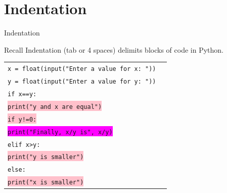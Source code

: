 \documentclass[t,handout,9pt]{beamer}
\begin{document}
\section{Indentation}
\begin{frame}{Indentation}
\begin{block}{Recall}
Indentation (tab or 4 spaces) delimits blocks of code in Python.
\end{block}
\begin{table}[]
\begin{flushleft}
\begin{tabular}{ll}
\texttt{x = float(input("Enter a value for x: "))} & \\
\texttt{y = float(input("Enter a value for y: "))} & \\
\texttt{if x==y:} & \\
\colorbox{pink}{\texttt{\qquad print("y and x are equal")}} & \\
\colorbox{pink}{\texttt{\qquad if y!=0:}} & \\
\colorbox{magenta}{\texttt{\qquad\qquad print("Finally, x/y is", x/y)}} & \\
\texttt{elif x>y:} & \\
\colorbox{pink}{\texttt{\qquad print("y is smaller")}} & \\
\texttt{else:} & \\
\colorbox{pink}{\texttt{\qquad print("x is smaller")}} & \\
\end{tabular}
\end{flushleft}
\end{table}
\end{frame}
\end{document}
